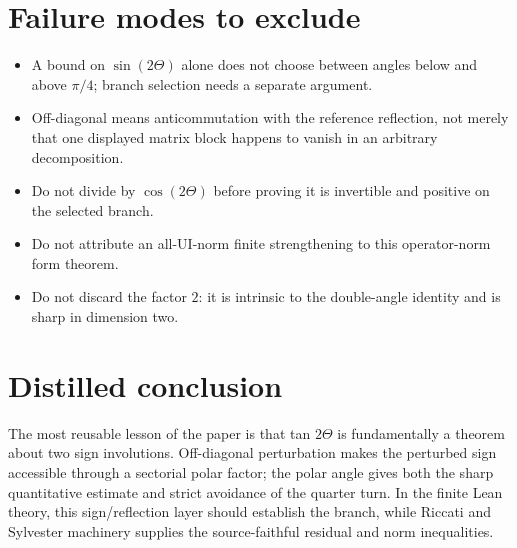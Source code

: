 \section{Failure modes to exclude}

\begin{itemize}[leftmargin=2em]
\item A bound on $\sin(2\Theta)$ alone does not choose between angles below and above $\pi/4$; branch selection needs a separate argument.
\item Off-diagonal means anticommutation with the reference reflection, not merely that one displayed matrix block happens to vanish in an arbitrary decomposition.
\item Do not divide by $\cos(2\Theta)$ before proving it is invertible and positive on the selected branch.
\item Do not attribute an all-UI-norm finite strengthening to this operator-norm form theorem.
\item Do not discard the factor $2$: it is intrinsic to the double-angle identity and is sharp in dimension two.
\end{itemize}

\section*{Distilled conclusion}

The most reusable lesson of the paper is that tan $2\Theta$ is fundamentally a theorem about two sign involutions. Off-diagonal perturbation makes the perturbed sign accessible through a sectorial polar factor; the polar angle gives both the sharp quantitative estimate and strict avoidance of the quarter turn. In the finite Lean theory, this sign/reflection layer should establish the branch, while Riccati and Sylvester machinery supplies the source-faithful residual and norm inequalities.



